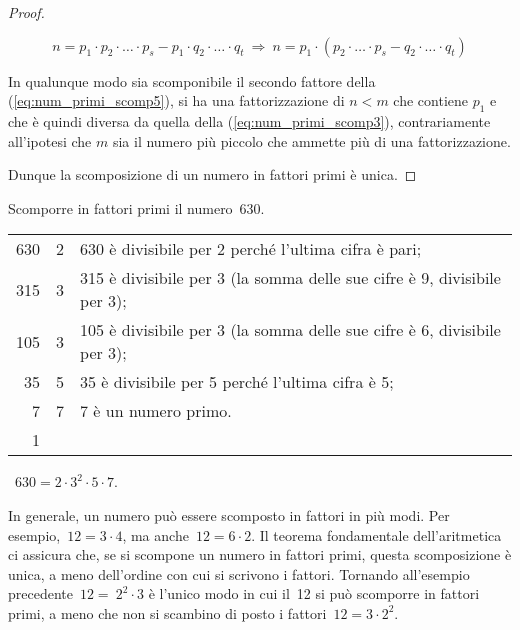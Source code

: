 \begin{proof}
\begin{enumerate}
\begin{equation}\label{eq:num_primi_scomp5}
n= p_1 \cdot p_2 \cdot \ldots\cdot p_s-p_1\cdot q_2 \cdot \ldots \cdot q_t \:\Rightarrow\: n = p_1\cdot(p_2\cdot \ldots \cdot p_s- q_2\cdot \ldots\cdot q_t)
\end{equation}

In qualunque modo sia scomponibile il secondo fattore della (\ref{eq:num_primi_scomp5}), si ha una fattorizzazione di $n<m$ che contiene $p_1$ e che è quindi diversa da quella della (\ref{eq:num_primi_scomp3}), contrariamente all'ipotesi che $m$ sia il numero più piccolo che ammette più di una fattorizzazione.
\end{enumerate}
Dunque la scomposizione di un numero in fattori primi è unica.
\end{proof}

\begin{exrig}
 \begin{esempio}
 Scomporre in fattori primi il numero~630.
 \begin{center}
% 
 \begin{tabular}{r|l@{\hspace{15mm}}l}
 	630 & 2 & 630 è divisibile per 2 perché l'ultima cifra è pari;\\
	315 & 3 & 315 è divisibile per 3 (la somma delle sue cifre è 9, divisibile per 3);\\
	105 & 3 & 105 è divisibile per 3 (la somma delle sue cifre è 6, divisibile per 3);\\
	35 & 5 & 35 è divisibile per 5 perché l'ultima cifra è 5;\\
	7 & 7 & 7 è un numero primo.\\
	1 & \\
 \end{tabular}
 ~$630=2\cdot3^2\cdot5\cdot7.$
 \end{center}
 \end{esempio}
\end{exrig}

In generale, un numero può essere scomposto in fattori in più modi. Per esempio,~$12=3\cdot 4$,
ma anche~$12=6\cdot2$. Il teorema fondamentale dell'aritmetica ci assicura che, se si scompone un numero in fattori primi,
questa scomposizione è unica, a meno dell'ordine con cui si scrivono i fattori. Tornando all'esempio
precedente~$12=~2^2\cdot 3$ è l'unico modo in cui il~12 si può scomporre in fattori primi, a meno che non si
scambino di posto i fattori~$12=3\cdot 2^2$.

